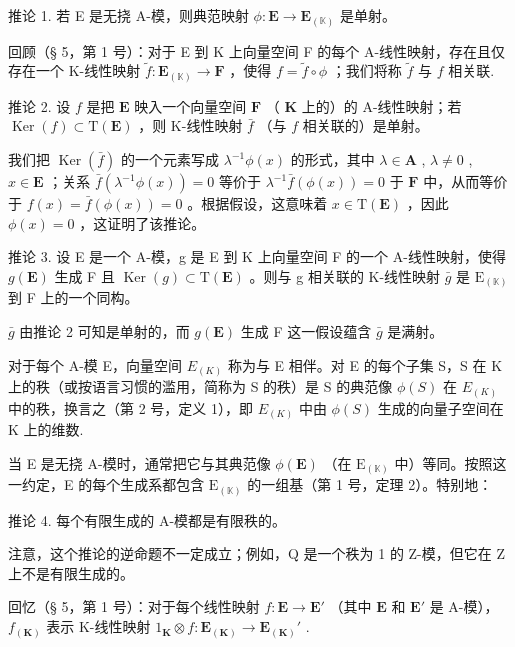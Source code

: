 推论 1. 若 E 是无挠 A-模，则典范映射 \(\phi: \mathbf{E} \to \mathbf{E}_{(\mathbb{K})}\) 是单射。

回顾（§ 5，第 1 号）：对于 E 到 K 上向量空间 F 的每个 A-线性映射，存在且仅存在一个 K-线性映射 \(\tilde{f}\colon\mathbf{E}_{(\mathbb{K})}\to\mathbf{F}\) ，使得 \(f=\tilde{f}\circ\phi\) ；我们将称 \(\tilde{f}\) 与 \(f\) 相关联.

推论 2. 设 \(f\) 是把 \(\mathbf{E}\) 映入一个向量空间 \(\mathbf{F}\) （ \(\mathbf{K}\) 上的）的 A-线性映射；若 \(\operatorname{Ker}(f) \subset \mathrm{T}(\mathbf{E})\) ，则 K-线性映射 \(\bar{f}\) （与 \(f\) 相关联的）是单射。

我们把 \(\operatorname{Ker}(\bar{f})\) 的一个元素写成 \(\lambda^{-1}\phi(x)\) 的形式，其中 \(\lambda \in \mathbf{A}\) , \(\lambda \neq 0\) , \(x \in \mathbf{E}\) ；关系 \(\bar{f}(\lambda^{-1}\phi(x)) = 0\) 等价于 \(\lambda^{-1}\bar{f}(\phi(x)) = 0\) 于 \(\mathbf{F}\) 中，从而等价于 \(f(x) = \bar{f}(\phi(x)) = 0\) 。根据假设，这意味着 \(x \in \mathrm{T}(\mathbf{E})\) ，因此 \(\phi(x) = 0\) ，这证明了该推论。

推论 3. 设 E 是一个 A-模，g 是 E 到 K 上向量空间 F 的一个 A-线性映射，使得 \(g(\mathbf{E})\) 生成 F 且 \(\operatorname{Ker}(g) \subset \mathrm{T}(\mathbf{E})\) 。则与 g 相关联的 K-线性映射 \(\bar{g}\) 是 \(\mathrm{E}_{(\mathbb{K})}\) 到 F 上的一个同构。

\(\bar{g}\) 由推论 2 可知是单射的，而 \(g(\mathbf{E})\) 生成 F 这一假设蕴含 \(\bar{g}\) 是满射。

对于每个 A-模 E，向量空间 \(E_{(K)}\) 称为与 E 相伴。对 E 的每个子集 S，S 在 K 上的秩（或按语言习惯的滥用，简称为 S 的秩）是 S 的典范像 \(\phi(S)\) 在 \(E_{(K)}\) 中的秩，换言之（第 2 号，定义 1），即 \(E_{(K)}\) 中由 \(\phi(S)\) 生成的向量子空间在 K 上的维数.

当 E 是无挠 A-模时，通常把它与其典范像 \(\phi(\mathbf{E})\) （在 \(\mathrm{E}_{(\mathbb{K})}\) 中）等同。按照这一约定，E 的每个生成系都包含 \(\mathrm{E}_{(\mathbb{K})}\) 的一组基（第 1 号，定理 2）。特别地：

推论 4. 每个有限生成的 A-模都是有限秩的。

注意，这个推论的逆命题不一定成立；例如，Q 是一个秩为 1 的 Z-模，但它在 Z 上不是有限生成的。

回忆（§ 5，第 1 号）：对于每个线性映射 \(f: \mathbf{E} \to \mathbf{E}'\) （其中 \(\mathbf{E}\) 和 \(\mathbf{E}'\) 是 A-模）， \(f_{(\mathbf{K})}\) 表示 K-线性映射 \(1_{\mathbf{K}} \otimes f: \mathbf{E}_{(\mathbf{K})} \to \mathbf{E}_{(\mathbf{K})}'\) .

